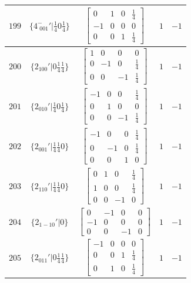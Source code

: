 \documentclass[fleqn,8pt]{jsarticle}
\begin{document}
\begin{longtable}{ccccc}
$ 199 $ & $ \{4^{-}_{\,\,001}{}'|\frac{1}{4} 0 \frac{1}{4}\} $ & $ \begin{bmatrix} 0 & 1 & 0 & \frac{1}{4} \\ -1 & 0 & 0 & 0 \\ 0 & 0 & 1 & \frac{1}{4} \end{bmatrix} $ & $ 1 $ & $ -1 $ \\ \hline
$ 200 $ & $ \{2{}_{100}{}'|0 \frac{1}{4} \frac{1}{4}\} $ & $ \begin{bmatrix} 1 & 0 & 0 & 0 \\ 0 & -1 & 0 & \frac{1}{4} \\ 0 & 0 & -1 & \frac{1}{4} \end{bmatrix} $ & $ 1 $ & $ -1 $ \\ \hline
$ 201 $ & $ \{2{}_{010}{}'|\frac{1}{4} 0 \frac{1}{4}\} $ & $ \begin{bmatrix} -1 & 0 & 0 & \frac{1}{4} \\ 0 & 1 & 0 & 0 \\ 0 & 0 & -1 & \frac{1}{4} \end{bmatrix} $ & $ 1 $ & $ -1 $ \\ \hline
$ 202 $ & $ \{2{}_{001}{}'|\frac{1}{4} \frac{1}{4} 0\} $ & $ \begin{bmatrix} -1 & 0 & 0 & \frac{1}{4} \\ 0 & -1 & 0 & \frac{1}{4} \\ 0 & 0 & 1 & 0 \end{bmatrix} $ & $ 1 $ & $ -1 $ \\ \hline
$ 203 $ & $ \{2{}_{110}{}'|\frac{1}{4} \frac{1}{4} 0\} $ & $ \begin{bmatrix} 0 & 1 & 0 & \frac{1}{4} \\ 1 & 0 & 0 & \frac{1}{4} \\ 0 & 0 & -1 & 0 \end{bmatrix} $ & $ 1 $ & $ -1 $ \\ \hline
$ 204 $ & $ \{2{}_{1-10}{}'|0\} $ & $ \begin{bmatrix} 0 & -1 & 0 & 0 \\ -1 & 0 & 0 & 0 \\ 0 & 0 & -1 & 0 \end{bmatrix} $ & $ 1 $ & $ -1 $ \\ \hline
$ 205 $ & $ \{2{}_{011}{}'|0 \frac{1}{4} \frac{1}{4}\} $ & $ \begin{bmatrix} -1 & 0 & 0 & 0 \\ 0 & 0 & 1 & \frac{1}{4} \\ 0 & 1 & 0 & \frac{1}{4} \end{bmatrix} $ & $ 1 $ & $ -1 $ \\ \hline

\end{longtable}
\end{document}
